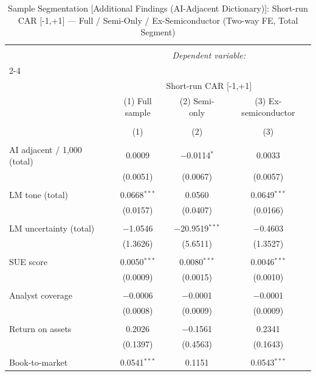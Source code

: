 
\begin{table}[!htbp] \centering 
  \caption{Sample Segmentation [Additional Findings (AI-Adjacent Dictionary)]: Short-run CAR [-1,+1] — Full / Semi-Only / Ex-Semiconductor (Two-way FE, Total Segment)} 
  \label{} 
\begin{tabular}{@{\extracolsep{5pt}}lccc} 
\\[-1.8ex]\hline 
\hline \\[-1.8ex] 
 & \multicolumn{3}{c}{\textit{Dependent variable:}} \\ 
\cline{2-4} 
\\[-1.8ex] & \multicolumn{3}{c}{Short-run CAR [-1,+1]} \\ 
 & (1) Full sample & (2) Semi-only & (3) Ex-semiconductor \\ 
\\[-1.8ex] & (1) & (2) & (3)\\ 
\hline \\[-1.8ex] 
 AI adjacent / 1,000 (total) & 0.0009 & $-$0.0114$^{*}$ & 0.0033 \\ 
  & (0.0051) & (0.0067) & (0.0057) \\ 
  & & & \\ 
 LM tone (total) & 0.0668$^{***}$ & 0.0560 & 0.0649$^{***}$ \\ 
  & (0.0157) & (0.0407) & (0.0166) \\ 
  & & & \\ 
 LM uncertainty (total) & $-$1.0546 & $-$20.9519$^{***}$ & $-$0.4603 \\ 
  & (1.3626) & (5.6511) & (1.3527) \\ 
  & & & \\ 
 SUE score & 0.0050$^{***}$ & 0.0080$^{***}$ & 0.0046$^{***}$ \\ 
  & (0.0009) & (0.0015) & (0.0010) \\ 
  & & & \\ 
 Analyst coverage & $-$0.0006 & $-$0.0001 & $-$0.0001 \\ 
  & (0.0008) & (0.0009) & (0.0009) \\ 
  & & & \\ 
 Return on assets & 0.2026 & $-$0.1561 & 0.2341 \\ 
  & (0.1397) & (0.4563) & (0.1643) \\ 
  & & & \\ 
 Book-to-market & 0.0541$^{***}$ & 0.1151 & 0.0543$^{***}$ \\ 

\end{tabular}
\end{table}

